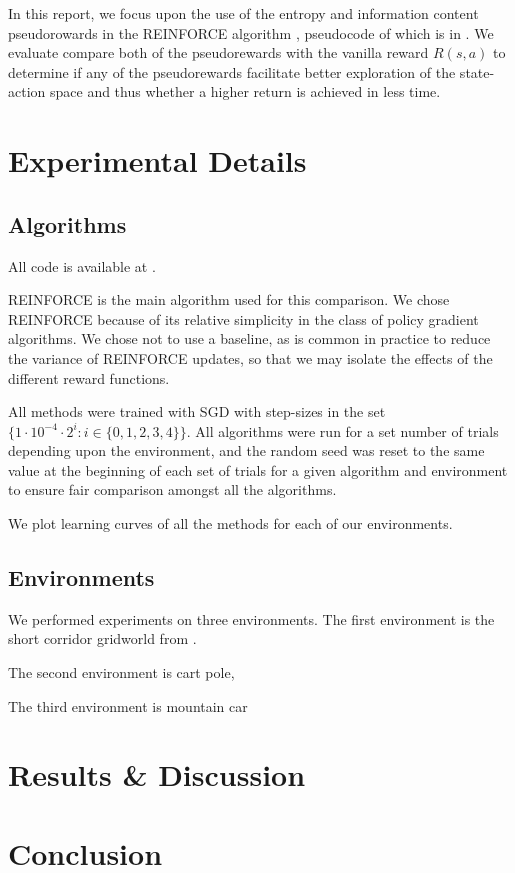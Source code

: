 \documentclass{article}
\begin{document}
  In this report, we focus upon the use of the entropy and information content pseudorowards in the REINFORCE algorithm \citep{williams1992simple}, pseudocode of which is in \citet[p.~328]{sutton2018reinforcement}. We evaluate compare both of the pseudorewards with the vanilla reward $R(s, a)$ to determine if any of the pseudorewards facilitate better exploration of the state-action space and thus whether a higher return is achieved in less time.

  \section{Experimental Details}
  \subsection{Algorithms}
  All code is available at \url{}.

  REINFORCE is the main algorithm used for this comparison. We chose REINFORCE because of its relative simplicity in the class of policy gradient algorithms. We chose not to use a baseline, as is common in practice to reduce the variance of REINFORCE updates, so that we may isolate the effects of the different reward functions.

  All methods were trained with SGD with step-sizes in the set $\{1 \cdot 10^{-4} \cdot 2^i : i \in \{0, 1, 2, 3, 4\}\}$. All algorithms were run for a set number of trials depending upon the environment, and the random seed was reset to the same value at the beginning of each set of trials for a given algorithm and environment to ensure fair comparison amongst all the algorithms.

  We plot learning curves of all the methods for each of our environments.

  \subsection{Environments}
  We performed experiments on three environments. The first environment is the short corridor gridworld from \citet[p.~323]{sutton2018reinforcement}.

  The second environment is cart pole,

  The third environment is mountain car

  \section{Results \& Discussion}

  \section{Conclusion}

  
  
\end{document}
